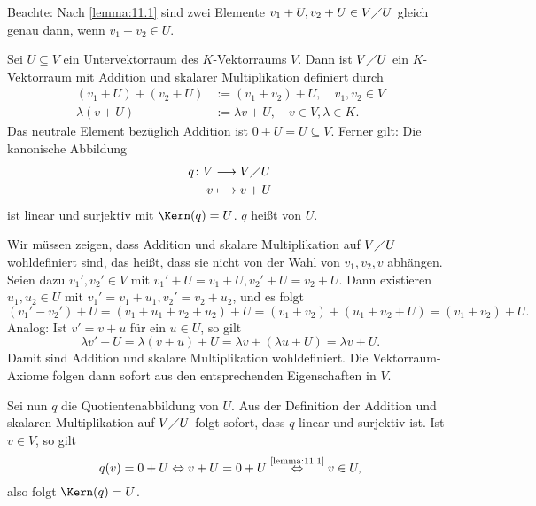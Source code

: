 Beachte: Nach \autoref{lemma:11.1} sind zwei Elemente $v_1+U, v_2 +U \in V \diagup U$ gleich genau dann, wenn $v_1 - v_2 \in U$.

\begin{satz}[Quotientenabbildung]
	\label{satz:11.3}
	Sei $U \subseteq V$ ein Untervektorraum des $K$-Vektorraums $V$.
	Dann ist $V \diagup U$ ein $K$-Vektorraum mit Addition und skalarer Multiplikation definiert durch
	\begin{align*}
		(v_1 + U) + (v_2 + U) &:= (v_1 + v_2) + U, \quad v_1,v_2 \in V \\
		\lambda (v+U) &:= \lambda v + U, \quad v \in V, \lambda \in K.
	\end{align*}
	Das neutrale Element bezüglich Addition ist $0 + U = U \subseteq V$.
	Ferner gilt:
	Die kanonische Abbildung
	\begin{align*}
		q\colon V &\longrightarrow V \diagup U \\
		v &\longmapsto v+U
	\end{align*}
	ist linear und surjektiv mit $\Kern(q) = U$.
	$q$ heißt  von $U$.
\end{satz}

\begin{beweis}
	Wir müssen zeigen, dass Addition und skalare Multiplikation auf $V \diagup U$ wohldefiniert sind, das heißt, dass sie nicht von der Wahl von $v_1,v_2,v$ abhängen.
	Seien dazu $v_1',v_2' \in V$ mit $v_1' + U = v_1 + U, v_2' + U = v_2 + U$.
	Dann existieren $u_1,u_2 \in U$ mit $v_1' = v_1 + u_1, v_2' = v_2+u_2$, und es folgt
	\[
		(v_1'-v_2')+U = (v_1+u_1+v_2+u_2)+U = (v_1+v_2) + (u_1+u_2+U) = (v_1+v_2) + U.
	\]
	Analog: Ist $v' = v+u$ für ein $u \in U$, so gilt
	\[
		\lambda v' + U = \lambda(v+u)+U = \lambda v + (\lambda u + U) = \lambda v + U.
	\]
	Damit sind Addition und skalare Multiplikation wohldefiniert.
	Die Vektorraum-Axiome folgen dann sofort aus den entsprechenden Eigenschaften in $V$.
	
	Sei nun $q$ die Quotientenabbildung von $U$.
	Aus der Definition der Addition und skalaren Multiplikation auf $V \diagup U$ folgt sofort, dass $q$ linear und surjektiv ist.
	Ist $v \in V$, so gilt
	\[
		q(v) = 0 + U \Leftrightarrow v+ U = 0+U \stackrel{\text{\ref{lemma:11.1}}}{\Leftrightarrow} v \in U,
	\]
	also folgt $\Kern(q) = U$. 
\end{beweis}

